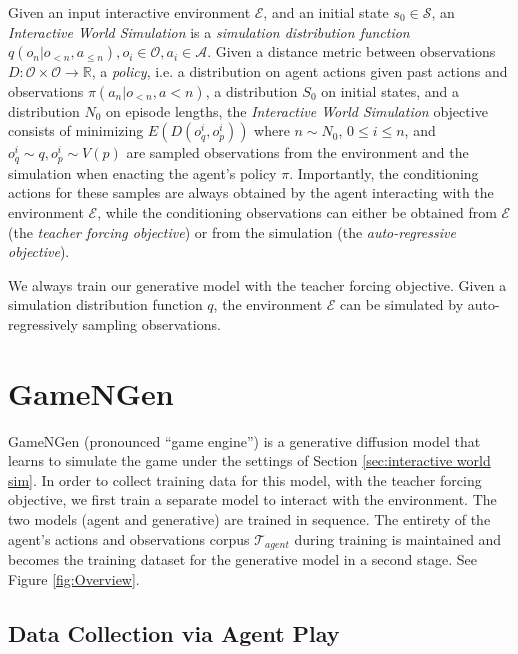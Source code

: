 \documentclass{article} %
\begin{document}
Given an input interactive environment $\mathcal{E}$, and an initial state $s_0 \in \mathcal{S}$, an \emph{Interactive World Simulation} is a \emph{simulation distribution function} $q(o_n| o_{<n}, a_{\le n}), o_i \in \mathcal{O}, a_i \in \mathcal{A}$.
Given a distance metric between observations $D:\mathcal{O}\times\mathcal{O} \to \mathbb{R}$, a \emph{policy}, i.e. a distribution on agent actions given past actions and observations $\pi(a_n|o_{<n}, a{<n})$, a distribution $S_0$ on initial states, and a distribution $N_0$ on episode lengths, the \emph{Interactive World Simulation} objective consists of minimizing $E(D(o_q^i, o_p^i))$ where $n \sim N_0$, $0 \le i \le n$, and $o_q^i \sim q, o_p^i \sim V(p)$ are sampled observations from the environment and the simulation when enacting the agent's policy $\pi$. Importantly, the conditioning actions for these samples are always obtained by the agent interacting with the environment $\mathcal{E}$, while the conditioning observations can either be obtained from $\mathcal{E}$ (the \emph{teacher forcing objective}) or from the simulation (the \emph{auto-regressive objective}).

We always train our generative model with the teacher forcing objective. Given a simulation distribution function $q$, the environment $\mathcal{E}$ can be simulated by auto-regressively sampling observations.


\section{GameNGen}

GameNGen (pronounced ``game engine'') is a generative diffusion model that learns to simulate the game under the settings of Section \ref{sec:interactive world sim}. In order to collect training data for this model, with the teacher forcing objective, we first train a separate model to interact with the environment. The two models (agent and generative) are trained in sequence. The entirety of the agent's actions and observations corpus $\mathcal{T}_{agent}$ during training is maintained and becomes the training dataset for the generative model in a second stage. See Figure \ref{fig:Overview}.



\subsection{Data Collection via Agent Play}
\label{agent-play}
\end{document}
